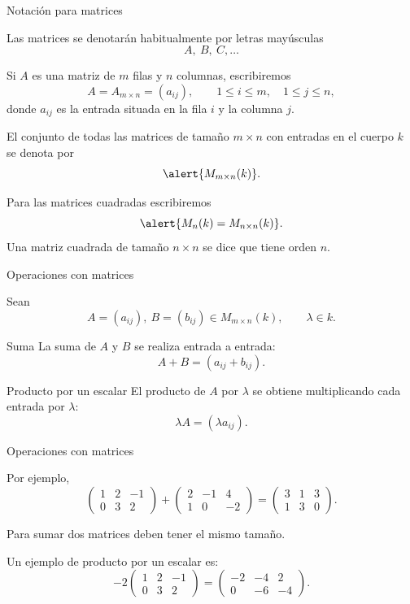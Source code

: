 \begin{frame}{Notación para matrices}

Las matrices se denotarán habitualmente por letras mayúsculas
\[
A,\ B,\ C,\ldots
\]

Si \(A\) es una matriz de \(m\) filas y \(n\) columnas, escribiremos
\[
A= A_{m\times n} =(a_{ij}),
\qquad
1\leq i\leq m,\quad 1\leq j\leq n,
\]
donde \(a_{ij}\) es la entrada situada en la
\alert{fila \(i\)} y la \alert{columna \(j\)}.

\pause

El conjunto de todas las matrices de tamaño \(m\times n\)
con entradas en el cuerpo \(k\) se denota por
\[
\alert{M_{m\times n}(k)}.
\]

Para las matrices cuadradas escribiremos
\[
\alert{M_n(k)=M_{n\times n}(k)}.
\]
Una matriz cuadrada de tamaño $n\times n$ se dice que tiene \alert{orden $n$}.

\end{frame}

\begin{frame}{Operaciones con matrices}

Sean
\[
A=(a_{ij}),\ B=(b_{ij})\in M_{m\times n}(k),
\qquad
\lambda\in k.
\]

\begin{block}{Suma}
La suma de \(A\) y \(B\) se realiza entrada a entrada:
\[
A+B=(a_{ij}+b_{ij}).
\]
\end{block}

\begin{block}{Producto por un escalar}
El producto de \(A\) por \(\lambda\) se obtiene multiplicando
cada entrada por \(\lambda\):
\[
\lambda A=(\lambda a_{ij}).
\]
\end{block}

\end{frame}

\begin{frame}{Operaciones con matrices}

Por ejemplo,
\[
\begin{pmatrix}
1&2&-1\\
0&3&2
\end{pmatrix}
+
\begin{pmatrix}
2&-1&4\\
1&0&-2
\end{pmatrix}
=
\begin{pmatrix}
3&1&3\\
1&3&0
\end{pmatrix}.
\]

\medskip

\alert{Para sumar dos matrices deben tener el mismo tamaño.}

\bigskip

Un ejemplo de producto por un escalar es:
\[
-2
\begin{pmatrix}
1&2&-1\\
0&3&2
\end{pmatrix}
=
\begin{pmatrix}
-2&-4&2\\
0&-6&-4
\end{pmatrix}.
\]

\end{frame}


